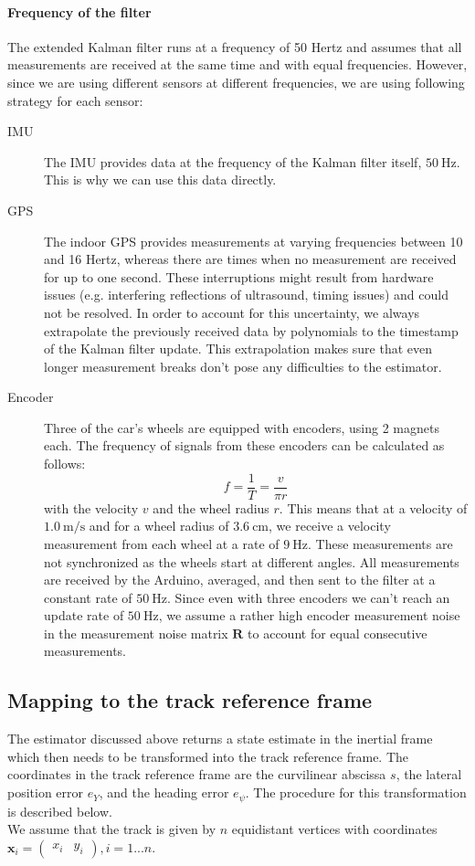 \paragraph{Frequency of the filter}
The extended Kalman filter runs at a frequency of 50 Hertz and assumes that all measurements are received at the same time and with equal frequencies. However, since we are using different sensors at different frequencies, we are using following strategy for each sensor:
\begin{description}
\item[IMU] The IMU provides data at the frequency of the Kalman filter itself, $\SI{50}{\hertz}$. This is why we can use this data directly.
\item[GPS] The indoor GPS provides measurements at varying frequencies between 10 and 16 Hertz, whereas there are times when no measurement are received for up to one second. These interruptions might result from hardware issues (e.g. interfering reflections of ultrasound, timing issues) and could not be resolved. In order to account for this uncertainty, we always extrapolate the previously received data by  polynomials to the timestamp of the Kalman filter update. This extrapolation makes sure that even longer measurement breaks don't pose any difficulties to the estimator.
\item[Encoder] Three of the car's wheels are equipped with encoders, using 2 magnets each. The frequency of signals from these encoders can be calculated as follows:
\begin{equation}
f =\frac{1}{T}=\frac{v}{\pi r}
\end{equation}
with the velocity $v$ and the wheel radius $r$. This means that at a velocity of $\SI{1.0}{\meter\per\second}$ and for a wheel radius of $\SI{3.6}{\centi\meter}$, we receive a velocity measurement from each wheel at a rate of $\SI{9}{\hertz}$. These measurements are not synchronized as the wheels start at different angles. All measurements are received by the Arduino, averaged, and then sent to the filter at a constant rate of $\SI{50}{\hertz}$. Since even with three encoders we can't reach an update rate of $\SI{50}{\hertz}$, we assume a rather high encoder measurement noise in the measurement noise matrix $\bm{R}$ to account for equal consecutive measurements.
\end{description}
\subsection{Mapping to the track reference frame}
The estimator discussed above returns a state estimate in the inertial frame which then needs to be transformed into the track reference frame. The coordinates in the track reference frame are the curvilinear abscissa $s$, the lateral position error $e_Y$, and the heading error $e_\psi$. The procedure for this transformation is described below.\\
We assume that the track is given by $n$ equidistant vertices with coordinates $\bm{x}_i = \begin{pmatrix}
x_i&y_i
\end{pmatrix},i=1...n$.

